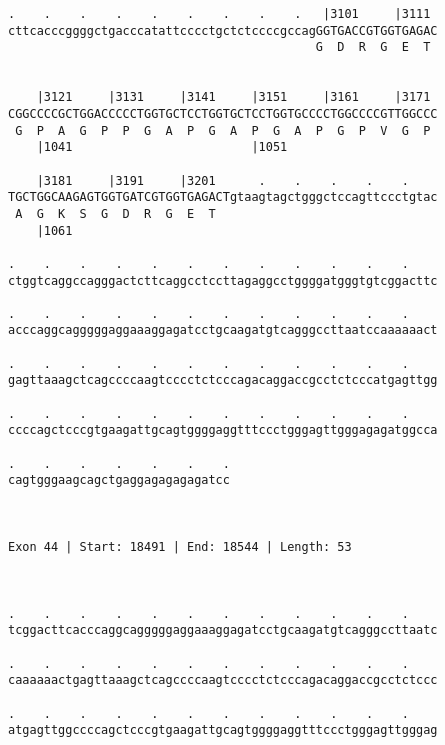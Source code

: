 \documentclass{article}
\begin{document}
\begin{Verbatim}
.    .    .    .    .    .    .    .    .   |3101     |3111 
cttcacccggggctgacccatattcccctgctctccccgccagGGTGACCGTGGTGAGAC
                                           G  D  R  G  E  T 
                                                            
  
    |3121     |3131     |3141     |3151     |3161     |3171 
CGGCCCCGCTGGACCCCCTGGTGCTCCTGGTGCTCCTGGTGCCCCTGGCCCCGTTGGCCC
 G  P  A  G  P  P  G  A  P  G  A  P  G  A  P  G  P  V  G  P 
    |1041                         |1051                     
  
    |3181     |3191     |3201      .    .    .    .    .    
TGCTGGCAAGAGTGGTGATCGTGGTGAGACTgtaagtagctgggctccagttccctgtac
 A  G  K  S  G  D  R  G  E  T                               
    |1061                                                   
  
.    .    .    .    .    .    .    .    .    .    .    .    
ctggtcaggccagggactcttcaggcctccttagaggcctggggatgggtgtcggacttc
                                                            
.    .    .    .    .    .    .    .    .    .    .    .    
acccaggcagggggaggaaaggagatcctgcaagatgtcagggccttaatccaaaaaact
                                                            
.    .    .    .    .    .    .    .    .    .    .    .    
gagttaaagctcagccccaagtcccctctcccagacaggaccgcctctcccatgagttgg
                                                            
.    .    .    .    .    .    .    .    .    .    .    .    
ccccagctcccgtgaagattgcagtggggaggtttccctgggagttgggagagatggcca
                                                            
.    .    .    .    .    .    .
cagtgggaagcagctgaggagagagagatcc
                               
                               
 
Exon 44 | Start: 18491 | End: 18544 | Length: 53



.    .    .    .    .    .    .    .    .    .    .    .    
tcggacttcacccaggcagggggaggaaaggagatcctgcaagatgtcagggccttaatc
                                                            
.    .    .    .    .    .    .    .    .    .    .    .    
caaaaaactgagttaaagctcagccccaagtcccctctcccagacaggaccgcctctccc
                                                            
.    .    .    .    .    .    .    .    .    .    .    .    
atgagttggccccagctcccgtgaagattgcagtggggaggtttccctgggagttgggag
                                                            

\end{Verbatim}
\end{document}
